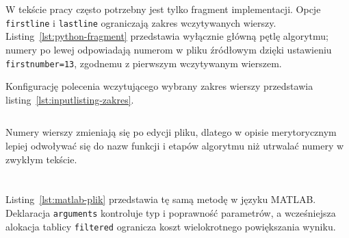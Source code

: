 \section{}

W tekście pracy często potrzebny jest tylko fragment implementacji. Opcje
\texttt{firstline} i \texttt{lastline} ograniczają zakres wczytywanych wierszy.
Listing~\ref{lst:python-fragment} przedstawia wyłącznie główną pętlę algorytmu;
numery po lewej odpowiadają numerom w pliku źródłowym dzięki ustawieniu
\texttt{firstnumber=13}, zgodnemu z pierwszym wczytywanym wierszem.



Konfigurację polecenia wczytującego wybrany zakres wierszy przedstawia
listing~\ref{lst:inputlisting-zakres}.

\begin{lstlisting}[style=thesis,caption={Wybór zakresu wierszy z pliku źródłowego},label={lst:inputlisting-zakres}]

\end{lstlisting}

Numery wierszy zmieniają się po edycji pliku, dlatego w opisie merytorycznym lepiej
odwoływać się do nazw funkcji i etapów algorytmu niż utrwalać numery w zwykłym tekście.

\section{}

Listing~\ref{lst:matlab-plik} przedstawia tę samą metodę w języku MATLAB. Deklaracja
\texttt{arguments} kontroluje typ i poprawność parametrów, a wcześniejsza alokacja
tablicy \texttt{filtered} ogranicza koszt wielokrotnego powiększania wyniku.



\section{}

